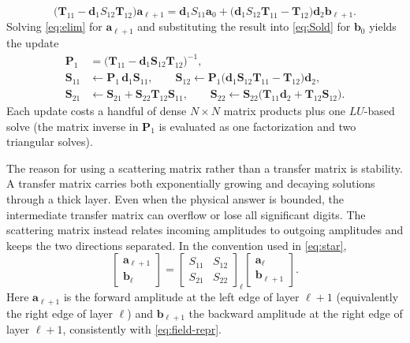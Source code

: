 \documentclass[11pt]{article}
\theoremstyle{remark}
\newcommand{\fa}{\mathbf{a}}
\newcommand{\fb}{\mathbf{b}}
\begin{document}
\begin{equation}
\bigl(\mathbf{T}_{11}-\mathbf{d}_1S_{12}\mathbf{T}_{12}\bigr)\fa_{\ell+1}
=\mathbf{d}_1S_{11}\fa_0
+\bigl(\mathbf{d}_1S_{12}\mathbf{T}_{11}-\mathbf{T}_{12}\bigr)
\mathbf{d}_2\fb_{\ell+1}.
\label{eq:elim}
\end{equation}
Solving \eqref{eq:elim} for $\fa_{\ell+1}$ and substituting the result into
\eqref{eq:Sold} for $\fb_0$ yields the update
\begin{align}
\mathbf{P}_1&=\big(\mathbf{T}_{11}-\mathbf{d}_1\mathbf{S}_{12}\mathbf{T}_{12}\big)^{-1},\nonumber\\
\mathbf{S}_{11}&\leftarrow\mathbf{P}_1\,\mathbf{d}_1\mathbf{S}_{11},\qquad
\mathbf{S}_{12}\leftarrow\mathbf{P}_1\big(\mathbf{d}_1\mathbf{S}_{12}\mathbf{T}_{11}-\mathbf{T}_{12}\big)\mathbf{d}_2,\nonumber\\
\mathbf{S}_{21}&\leftarrow\mathbf{S}_{21}+\mathbf{S}_{22}\mathbf{T}_{12}\mathbf{S}_{11},\qquad
\mathbf{S}_{22}\leftarrow\mathbf{S}_{22}\big(\mathbf{T}_{11}\mathbf{d}_2+\mathbf{T}_{12}\mathbf{S}_{12}\big).
\label{eq:star}
\end{align}
Each update costs a handful of dense $N\times N$ matrix products plus one
$LU$-based solve (the matrix inverse in $\mathbf{P}_1$ is evaluated as one
factorization and two triangular solves).

The reason for using a scattering matrix rather than a transfer matrix is
stability.  A transfer matrix carries both exponentially growing and decaying
solutions through a thick layer.  Even when the physical answer is bounded,
the intermediate transfer matrix can overflow or lose all significant digits.
The scattering matrix instead relates incoming amplitudes to outgoing
amplitudes and keeps the two directions separated.  In the convention used in
\eqref{eq:star},
\begin{equation}
\begin{bmatrix}\fa_{\ell+1}\\ \fb_{\ell}\end{bmatrix}
=\begin{bmatrix}S_{11}&S_{12}\\S_{21}&S_{22}\end{bmatrix}_{\!\ell}
\begin{bmatrix}\fa_{\ell}\\ \fb_{\ell+1}\end{bmatrix}.
\label{eq:scattering-convention}
\end{equation}
Here $\fa_{\ell+1}$ is the forward amplitude at the left edge of layer
$\ell+1$ (equivalently the right edge of layer $\ell$) and
$\fb_{\ell+1}$ the backward amplitude at the right edge of layer $\ell+1$,
consistently with \eqref{eq:field-repr}.
\end{document}
